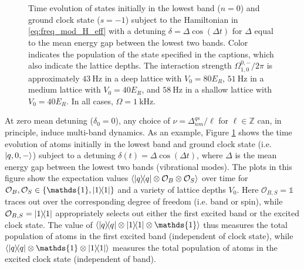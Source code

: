 \documentclass[aps,notitlepage,nofootinbib,11pt]{revtex4-1}
\renewcommand{\t}{\text} %
\newcommand{\p}[1]{\left(#1\right)} %
\renewcommand{\set}[1]{\left\{#1\right\}} %
\newcommand{\bk}{\Braket} %
\newcommand{\1}{\mathds{1}}
\newcommand{\Z}{\mathbb Z}
\renewcommand{\O}{\mathcal O}
\begin{document}
\begin{figure}[hp]
  \captionsetup[subfloat]{farskip=1pt,captionskip=1pt}
   
  \\
   
  \\
   
  \caption{Time evolution of states initially in the lowest band
    ($n=0$) and ground clock state ($s=-1$) subject to the Hamiltonian
    in \eqref{eq:freq_mod_H_eff} with a detuning
    $\delta=\Delta\cos\p{\Delta t}$ for $\Delta$ equal to the mean
    energy gap between the lowest two bands.  Color indicates the
    population of the state specified in the captions, which also
    indicate the lattice depths.  The interaction strength
    $\Omega^{0,-}_{1,0}/2\pi$ is approximately $43~\t{Hz}$ in a deep
    lattice with $V_0=80E_R$, $51~\t{Hz}$ in a medium lattice with
    $V_0=40E_R$, and $58~\t{Hz}$ in a shallow lattice with
    $V_0=40E_R$.  In all cases, $\Omega=1~\t{kHz}$.}
  \label{fig:freq_mod}
\end{figure}

At zero mean detuning ($\delta_0=0$), any choice of
$\nu=\Delta^{qs}_{nm}/\ell$ for $\ell\in\Z$ can, in principle, induce
multi-band dynamics.  As an example, Figure \ref{fig:freq_mod} shows
the time evolution of atoms initially in the lowest band and ground
clock state (i.e. $\ket{q,0,-}$) subject to a detuning
$\delta\p{t}=\Delta\cos\p{\Delta t}$, where $\Delta$ is the mean
energy gap between the lowest two bands (vibrational modes).  The
plots in this figure show the expectation values
$\bk{\op{q}\otimes\O_B\otimes\O_S}$ over time for
$\O_B,\O_S\in\set{\1,\op{1}}$ and a variety of lattice depths $V_0$.
Here $\O_{B,S}=\1$ traces out over the corresponding degree of freedom
(i.e. band or spin), while $\O_{B,S}=\op{1}$ appropriately selects out
either the first excited band or the excited clock state.  The value
of $\bk{\op{q}\otimes\op{1}\otimes\1}$ thus measures the total
population of atoms in the first excited band (independent of clock
state), while $\bk{\op{q}\otimes\1\otimes\op{1}}$ measures the total
population of atoms in the excited clock state (independent of band).
\end{document}
